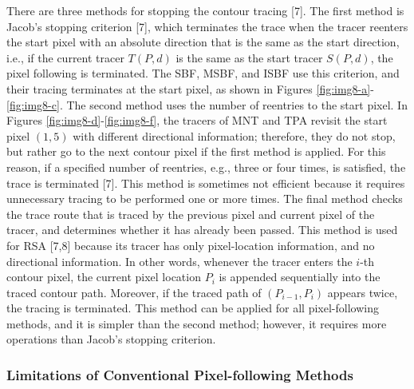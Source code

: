 There are three methods for stopping the contour tracing [7]. The first method is Jacob’s stopping criterion [7], which terminates the trace when the tracer reenters the start pixel with an absolute direction that is the same as the start direction, i.e., if the current tracer $T(P,d)$ is the same as the start tracer $S(P,d)$, the pixel following is terminated. The SBF, MSBF, and ISBF use this criterion, and their tracing terminates at the start pixel, as shown in Figures \ref{fig:img8-a}-\ref{fig:img8-c}. The second method uses the number of reentries to the start pixel. In Figures \ref{fig:img8-d}-\ref{fig:img8-f}, the tracers of MNT and TPA revisit the start pixel $(1, 5)$ with different directional information; therefore, they do not stop, but rather go to the next contour pixel if the first method is applied. For this reason, if a specified number of reentries, e.g., three or four times, is satisfied, the trace is terminated [7]. This method is sometimes not efficient because it requires unnecessary tracing to be performed one or more times. The final method checks the trace route that is traced by the previous pixel and current pixel of the tracer, and determines whether it has already been passed. This method is used for RSA [7,8] because its tracer has only pixel-location information, and no directional information. In other words, whenever the tracer enters the $i$-th contour pixel, the current pixel location $P_i$ is appended sequentially into the traced contour path. Moreover, if the traced path of $(P_{i-1}, P_i)$ appears twice, the tracing is terminated. This method can be applied for all pixel-following methods, and it is simpler than the second method; however, it requires more operations than Jacob's stopping criterion.

\subsubsection{Limitations of Conventional Pixel-following Methods}

